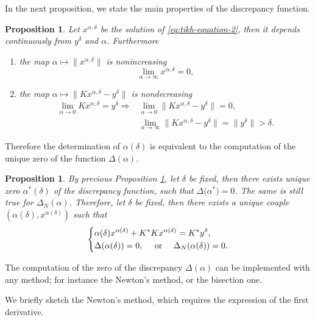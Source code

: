 \documentclass[10pt, a4paper, twoside, openright]{book}
\theoremstyle{definition}
\theoremstyle{plain}
\theoremstyle{plain}
\theoremstyle{plain}
\newtheorem{proposition}[subsection]{Proposition}
\theoremstyle{plain}
\theoremstyle{plain}
\theoremstyle{plain}
\theoremstyle{plain}
\theoremstyle{plain}
\begin{document}
In the next proposition, we state the main properties of the discrepancy function.
\begin{proposition}
\label{prop:properties-disc}
 Let $x^{\alpha,\delta}$ be the solution of \ref{eq:tikh-equation-2}, then 
 it depends continuously from $y^\delta$ and $\alpha$. Furthermore
 \begin{enumerate}
  \item the map $\alpha\mapsto \|x^{\alpha, \delta}\|$ is nonincreasing
  \begin{equation}
   \lim_{\alpha\to\infty} x^{\alpha, \delta} = 0,
  \end{equation}
  \item the map $\alpha\mapsto \|Kx^{\alpha, \delta} - y^\delta\|$ is nondecreasing
  \begin{align}
   \lim_{\alpha\to0} Kx^{\alpha, \delta} = y^\delta \Rightarrow &\lim_{\alpha\to0}\|Kx^{\alpha, \delta} - y^\delta\| = 0,\\
   &\lim_{\alpha\to\infty}\|Kx^{\alpha, \delta} - y^\delta\| = \|y^\delta\|>\delta.
  \end{align}
 \end{enumerate}
\end{proposition}
Therefore the determination of $\alpha(\delta)$ is equivalent to the computation 
of the unique zero of the function $\Delta(\alpha)$.
\begin{proposition}
\label{prop:strategy-disc}
 By previous Proposition \ref{prop:properties-disc}, let $\delta$ be fixed, then there 
 exists unique zero $\alpha^*(\delta)$ of the discrepancy function, 
 such that $\Delta\bigl(\alpha^*\bigr)=0$. The same is still true for $\Delta_N(\alpha)$.
 Therefore, let $\delta$ be fixed, then there exists a unique 
 couple $(\alpha(\delta), x^{\alpha(\delta)})$ such that
 \begin{equation}
  \left\{
  \begin{split}
   & \alpha(\delta) x^{\alpha(\delta)} + K^*Kx^{\alpha(\delta)} = K^*y^\delta, \\
   & \Delta(\alpha(\delta))=0, \quad\textup{ or }\quad \Delta_N(\alpha(\delta))=0.
  \end{split}
  \right.
 \end{equation}
\end{proposition}
The computation of the zero of the discrepancy $\Delta(\alpha)$ can be implemented 
with any method; for instance the Newton's method, or the bisection one.
\par
We briefly sketch the Newton's method, which requires the expression of the first derivative.
\end{document}
